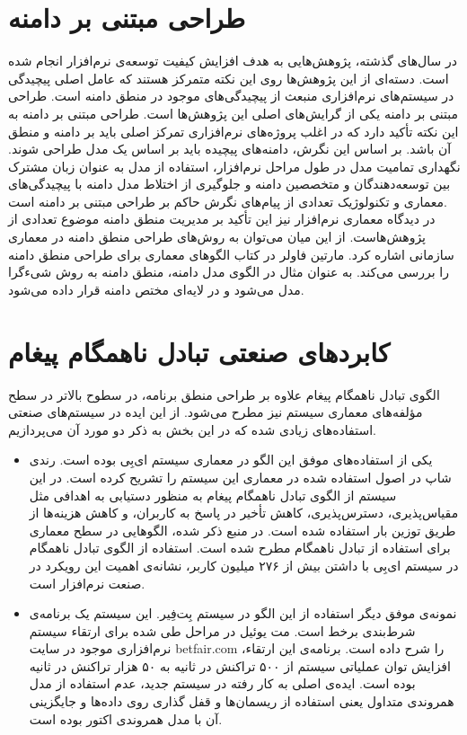\section{طراحی مبتنی بر دامنه}
در سال‌های گذشته، پژوهش‌هایی به هدف افزایش کیفیت توسعه‌ی نرم‌افزار انجام شده است. دسته‌ای از این پژوهش‌ها روی این نکته متمرکز هستند که عامل اصلی پیچیدگی‌ در سیستم‌های نرم‌افزاری منبعث از پیچیدگی‌های موجود در منطق دامنه است. طراحی مبتنی بر دامنه\cite{DDD-2003} یکی از گرایش‌های اصلی این پژوهش‌ها است.  طراحی مبتنی بر دامنه به این نکته تأکید دارد که در اغلب پروژه‌های نرم‌افزاری تمرکز اصلی باید بر دامنه و منطق آن باشد. بر اساس این نگرش، دامنه‌های پیچیده باید بر اساس یک مدل طراحی شوند. نگهداری تمامیت مدل در طول مراحل نرم‌افزار، استفاده از مدل به عنوان زبان مشترک بین توسعه‌دهندگان و متخصصین دامنه و جلوگیری از اختلاط مدل دامنه با پیچیدگی‌های معماری و تکنولوژیک تعدادی از پیام‌های نگرش حاکم بر طراحی مبتنی بر دامنه است. \\
در دیدگاه معماری نرم‌افزار نیز این تأکید بر مدیریت منطق دامنه موضوع تعدادی از پژوهش‌هاست. از این میان می‌توان به روش‌های طراحی منطق دامنه در معماری سازمانی اشاره کرد. مارتین فاولر در کتاب \cite{Fowler_Patterns} الگوهای معماری برای طراحی منطق دامنه را بررسی می‌کند. به عنوان مثال در الگوی مدل دامنه\cite{Fowler_Patterns}، منطق دامنه به روش شیءگرا مدل می‌شود و در لایه‌ای مختص دامنه قرار داده می‌شود. 

\section{کابردهای صنعتی تبادل ناهمگام پیغام}
الگوی تبادل ناهمگام پیغام علاوه بر طراحی منطق برنامه، در سطوح بالاتر در سطح مؤلفه‌های معماری سیستم نیز مطرح می‌شود. از این ایده در سیستم‌های صنعتی استفاده‌های زیادی شده که در این بخش به ذکر دو مورد آن می‌پردازیم.
\begin{itemize}
\item یکی از استفاده‌های موفق این الگو در معماری سیستم ای‌بِی بوده است. رندی شاپ در \cite{Shoup08theebay} اصول استفاده شده در معماری این سیستم را تشریح کرده است. در این سیستم از الگوی تبادل ناهمگام پیغام به منظور دستیابی به اهدافی مثل
\gls{مقیاس‌پذیری}، \gls{دسترس‌پذیری}، کاهش تأخیر در پاسخ به کاربران،  و کاهش هزینه‌ها از طریق توزین بار استفاده شده است. در منبع ذکر شده، الگوهایی در سطح معماری برای استفاده از تبادل ناهمگام مطرح شده است. استفاده از الگوی تبادل ناهمگام در سیستم ای‌بِی با داشتن بیش از ۲۷۶ میلیون کاربر، نشانه‌ی اهمیت این رویکرد در صنعت نرم‌افزار است.\cite{Shoup08theebay}
\item نمونه‌ی موفق دیگر استفاده از این الگو در سیستم بِت‌فِیر. این سیستم یک برنامه‌ی شرط‌بندی برخط است.
مت یوئیل در \cite{betfair} مراحل ‌طی شده برای ارتقاء سیستم نرم‌افزاری موجود در سایت betfair.com را شرح داده است. برنامه‌ی این ارتقاء، افزایش توان عملیاتی سیستم از ۵۰۰ تراکنش در ثانیه به ۵۰ هزار تراکنش در ثانیه بوده است. ایده‌ی اصلی به کار رفته در سیستم جدید، عدم استفاده از مدل همروندی متداول یعنی استفاده از ریسمان‌ها و قفل گذاری روی داده‌ها و جایگزینی آن با مدل همروندی اکتور بوده است.\cite{betfair}
\end{itemize}